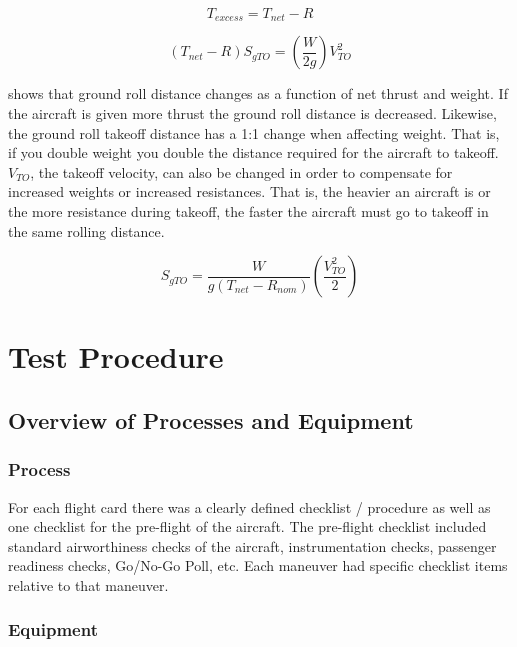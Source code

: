 \documentclass[conf]{new-aiaa}
\begin{document}
\begin{equation} \label{thrustexcess}
T_{excess} = T_{net} - R
\end{equation}

\begin{equation} \label{workperspective}
(T_{net} - R)S_{gTO} = (\dfrac{W}{2g})V_{TO}^2
\end{equation}

 shows that ground roll distance changes as a function of net thrust and weight. If the aircraft is given more thrust the ground roll distance is decreased. Likewise, the ground roll takeoff distance has a 1:1 change when affecting weight. That is, if you double weight you double the distance required for the aircraft to takeoff. \(V_{TO}\), the takeoff velocity, can also be changed in order to compensate for increased weights or increased resistances. That is, the heavier an aircraft is or the more resistance during takeoff, the faster the aircraft must go to takeoff in the same rolling distance. 

\begin{equation} \label{groundrolldistance}
S_{gTO} = \dfrac{W}{g(T_{net}-R_{nom})}(\dfrac{V_{TO}^2}{2})
\end{equation}

\section{Test Procedure}

\subsection{Overview of Processes and Equipment}

\subsubsection{Process}

For each flight card there was a clearly defined checklist / procedure as well as one checklist for the pre-flight of the aircraft. The pre-flight checklist included standard airworthiness checks of the aircraft, instrumentation checks, passenger readiness checks, Go/No-Go Poll, etc. Each maneuver had specific checklist items relative to that maneuver. 

\subsubsection{Equipment}
\end{document}
